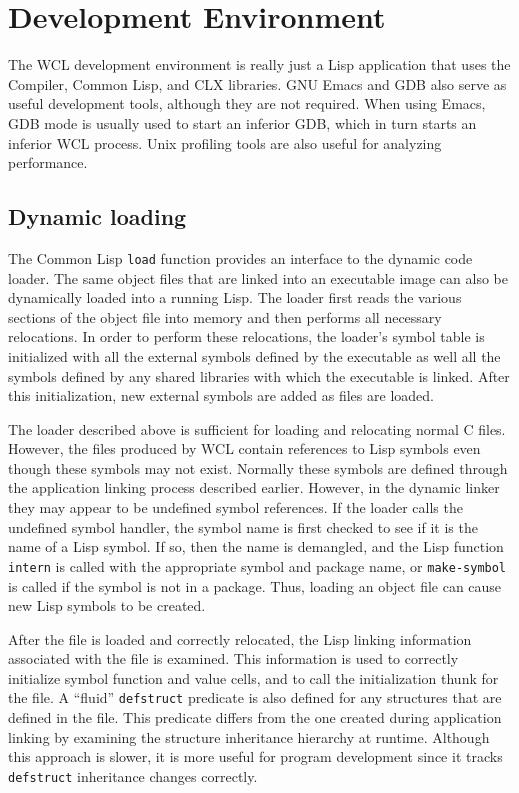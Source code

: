 \section{Development Environment}

The WCL development environment is really just a Lisp application that
uses the Compiler, Common Lisp, and CLX libraries. GNU Emacs
\cite{emacs} and GDB also serve as useful development tools, although
they are not required.  When using Emacs, GDB mode is usually used to
start an inferior GDB, which in turn starts an inferior WCL process.
Unix profiling tools are also useful for analyzing performance.

\subsection{Dynamic loading}

The Common Lisp {\tt load} function provides an interface to the dynamic
code loader. The same object files that are linked into an
executable image can also be dynamically loaded into a running Lisp.
The loader first reads the various sections of the object file into
memory and then performs all necessary relocations. In order to
perform these relocations, the loader's symbol table is initialized
with all the external symbols defined by the executable as well all
the symbols defined by any shared libraries with which the executable
is linked.  After this initialization, new external symbols are added
as files are loaded.

The loader described above is sufficient for loading and relocating
normal C files. However, the files produced by WCL contain references
to Lisp symbols even though these symbols may not exist.  Normally
these symbols are defined through the application linking process described
earlier. However, in the dynamic linker they may appear to be
undefined symbol references. If the loader calls the undefined symbol
handler, the symbol name is first checked to see if it is the name of a
Lisp symbol. If so, then the name is demangled, and the Lisp function
{\tt intern} is called with the appropriate symbol and package name, or
{\tt make-symbol} is called if the symbol is not in a package.  Thus,
loading an object file can cause new Lisp symbols to be created.

After the file is loaded and correctly relocated, the Lisp linking
information associated with the file is examined. This information is
used to correctly initialize symbol function and value cells, and to
call the initialization thunk for the file. A ``fluid'' {\tt defstruct}
predicate is also defined for any structures that are defined in the
file.  This predicate differs from the one created during application
linking by examining the structure inheritance hierarchy at runtime.
Although this approach is slower, it is more useful for program
development since it tracks {\tt defstruct} inheritance changes correctly.

